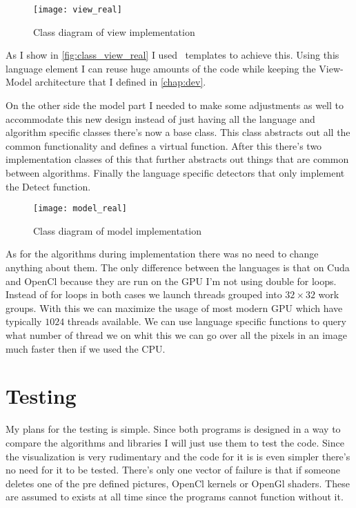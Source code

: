 \begin{figure}[H]
\centering
\texttt{[image: view\_real]}
\caption{Class diagram of view implementation}
\label{fig:class_view_real}
\end{figure}

As I show in \autoref{fig:class_view_real} I used \CC\ templates to achieve this. Using this language element I can reuse huge amounts of the code while keeping the View-Model architecture that I defined in \autoref{chap:dev}.

On the other side the model part I needed to make some adjustments as well to accommodate this new design instead of just having all the language and algorithm specific classes there's now a base class. This class abstracts out all the common functionality and defines a virtual function. After this there's two implementation classes of this that further abstracts out things that are common between algorithms. Finally the language specific detectors that only implement the Detect function.

\begin{figure}[H]
\centering
\texttt{[image: model\_real]}
\caption{Class diagram of model implementation}
\label{fig:class_model_real}
\end{figure}

As for the algorithms during implementation there was no need to change anything about them. The only difference between the languages is that on Cuda and OpenCl because they are run on the \ac{GPU} I'm not using double for loops. Instead of for loops in both cases we launch threads grouped into $32 \times 32$ work groups. With this we can maximize the usage of most modern \ac{GPU} which have typically $1024$ threads available. We can use language specific functions to query what number of thread we on whit this we can go over all the pixels in an image much faster then if we used the \ac{CPU}. 


\section{Testing}
\label{chap:dev_testing}

My plans for the testing is simple. Since both programs is designed in a way to compare the algorithms and libraries I will just use them to test the code. Since the visualization is very rudimentary and the code for it is is even simpler there's no need for it to be tested. There's only one vector of failure is that if someone deletes one of the pre defined pictures, OpenCl kernels or OpenGl shaders. These are assumed to exists at all time since the programs cannot function without it.

